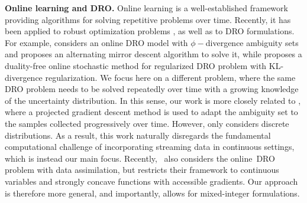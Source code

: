 \documentclass[12pt]{article}
\renewcommand{\paragraph}[1]{\textbf{#1.}\;}
\newcommand{\MartaNote}[1]{\textcolor{green}{\textbf{[M: #1]}}}
\begin{document}
\paragraph{Online learning and \gls{DRO}}
Online learning is a well-established framework providing algorithms for solving repetitive problems over time. Recently, it has been applied to robust optimization problems \cite{ho2018online,chen2017robust}, as well as to DRO formulations. For example, \cite{namkoong2016stochastic} considers an online DRO model with $\phi-$divergence ambiguity sets and proposes an alternating mirror descent algorithm to solve it, while \cite{qi2021online} proposes a duality-free online stochastic method for regularized DRO problem with KL-divergence regularization. We focus here on a different problem, where the same DRO problem needs to be solved repeatedly over time with a growing knowledge of the uncertainty distribution. In this sense, our work is more closely related to \cite{drotime}, where a projected gradient descent method is used to adapt the ambiguity set to the samples collected progressively over time. However, \cite{drotime} only considers discrete distributions. As a result, this work naturally disregards the fundamental computational challenge of incorporating streaming data in continuous settings, which is instead our main focus.
Recently,~\cite{assim} also considers the online~\gls{DRO} problem with data assimilation, but restricts their framework to continuous variables and strongly concave functions with accessible gradients. Our approach is therefore more general, and importantly, allows for mixed-integer formulations. 

\end{document}
